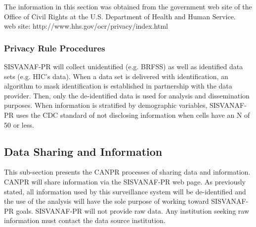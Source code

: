 \documentclass[12pt,letterpaper]{report}
\begin{document}
The information in this section was obtained from the government web site of the Office of Civil Rights at the U.S. Department of Health and Human Service.\\
web site: http://www.hhs.gov/ocr/privacy/index.html
	
\subsubsection{Privacy Rule Procedures}

SISVANAF-PR will collect unidentified (e.g. BRFSS) as well as identified data sets (e.g. HIC's data).  When a data set is delivered with identification, an algorithm to mask identification is established in partnership with the data provider. Then, only the de-identified data is used for analysis and dissemination purposes.  When information is stratified by demographic variables, SISVANAF-PR uses the CDC standard of not disclosing information when cells have an N of 50 or less.

\subsection{Data Sharing and Information}
This sub-section presents the CANPR processes of sharing data and information. CANPR will share information via the SISVANAF-PR web page.  As previously stated, all information used by this surveillance system will be de-identified and the use of the analysis will have the sole purpose of working toward SISVANAF-PR goals. SISVANAF-PR will not provide raw data.  Any institution seeking raw information must contact the data source institution. 
\end{document}
